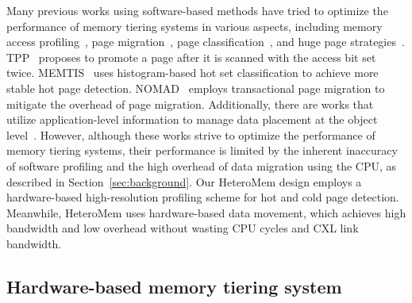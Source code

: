 Many previous works using software-based methods have tried to optimize the performance of memory tiering systems in various aspects, including memory access profiling~\cite{thermostat_asplos17, dancing_ipdps21, re_fault_icbdsc22, damon}, page migration~\cite{page_migration_support_for_disaggregated_non_volatile_memories_memsys19, granularity_aware_page_migration_ics18, nimble_asplos19}, page classification~\cite{ebm, multi-clock}, and huge page strategies~\cite{amp, memtis_sosp23}.
TPP~\cite{tpp_asplos23} proposes to promote a page after it is scanned with the access bit set twice. MEMTIS~\cite{memtis_sosp23} uses histogram-based hot set classification to achieve more stable hot page detection. NOMAD~\cite{nomad_osdi24} employs transactional page migration to mitigate the overhead of page migration.
Additionally, there are works that utilize application-level information to manage data placement at the object level~\cite{memkind, pmdk, hildebrand2020autotm, li2022GCMove, ren2021sentinel, Wang2019Panthera, wei2015_2pp}. However, although these works strive to optimize the performance of memory tiering systems, their performance is limited by the inherent inaccuracy of software profiling and the high overhead of data migration using the CPU, as described in Section~\ref{sec:background}.
Our HeteroMem design employs a hardware-based high-resolution profiling scheme for hot and cold page detection. Meanwhile, HeteroMem uses hardware-based data movement, which achieves high bandwidth and low overhead without wasting CPU cycles and CXL link bandwidth.

\subsection{Hardware-based memory tiering system}

